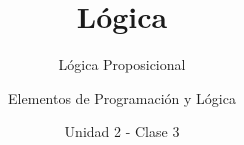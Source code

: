 \documentclass[usenames,dvipsnames]{../../common/beamerUNQ}
\title{Lógica}
\subtitle{Lógica Proposicional}
\author{Elementos de Programación y Lógica}
\date{Unidad 2 - Clase 3}
\begin{document}
  \titleframe
  \toc
  
  \finaltitleframe
\end{document}
